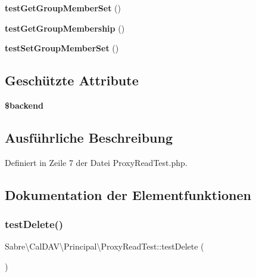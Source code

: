 \begin{DoxyCompactItemize}
{\bfseries test\+Get\+Group\+Member\+Set} ()
\item 
\mbox{\label{class_sabre_1_1_cal_d_a_v_1_1_principal_1_1_proxy_read_test_a96e26f65336d05170b4f1f044bab96dd}} 
{\bfseries test\+Get\+Group\+Membership} ()
\item 
\mbox{\label{class_sabre_1_1_cal_d_a_v_1_1_principal_1_1_proxy_read_test_a491829d8e501b35c965240efb7b69c14}} 
{\bfseries test\+Set\+Group\+Member\+Set} ()
\end{DoxyCompactItemize}
\subsection*{Geschützte Attribute}
\begin{DoxyCompactItemize}
\item 
\mbox{\label{class_sabre_1_1_cal_d_a_v_1_1_principal_1_1_proxy_read_test_aa66c9fd2198a83d3dee51ba943d12b92}} 
{\bfseries \$backend}
\end{DoxyCompactItemize}


\subsection{Ausführliche Beschreibung}


Definiert in Zeile 7 der Datei Proxy\+Read\+Test.\+php.



\subsection{Dokumentation der Elementfunktionen}
\mbox{\label{class_sabre_1_1_cal_d_a_v_1_1_principal_1_1_proxy_read_test_a5b61193066d084097a09e83b1fd1e26a}} 
\subsubsection{\texorpdfstring{test\+Delete()}{testDelete()}}
{\footnotesize\ttfamily Sabre\textbackslash{}\+Cal\+D\+A\+V\textbackslash{}\+Principal\textbackslash{}\+Proxy\+Read\+Test\+::test\+Delete (\begin{DoxyParamCaption}{ }\end{DoxyParamCaption})}

